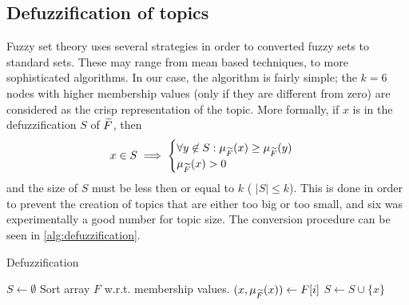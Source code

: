 \subsection{Defuzzification of topics}
Fuzzy set theory uses several strategies in order to converted fuzzy sets to standard sets. These may range from mean based techniques, to more sophisticated algorithms. In our case, the algorithm is fairly simple; the $k=6$ nodes with higher membership values (only if they are different from zero) are considered as the crisp representation of the topic. More formally, if $x$ is in the defuzzification $S$ of $\widetilde{F}$, then 
$$
    x\in S \implies \begin{cases}
    \forall y\not\in S: \mu_{\widetilde{F}}(x) \ge \mu_{\widetilde{F}}(y)\\
    \mu_{\widetilde{F}}(x) > 0
    \end{cases}
$$
and the size of $S$ must be less then or equal to $k$ (\ie{} $|S| \le k$).
This is done in order to prevent the creation of topics  that are either too big or too small, and six was experimentally a good number for topic size. The conversion procedure can be seen in \cref{alg:defuzzification}.
\begin{algorithm}
\caption{Defuzzification}\label{alg:defuzzification}
\begin{algorithmic}[1]
    \Statex
        \State{} $ S \leftarrow \emptyset$ 
        \State{} Sort array $F$ w.r.t. membership values.
        \State{} $(x,\mu_{\widetilde{F}}(x))\leftarrow F[i]$
         $S\leftarrow S \cup \{x\}$
        \EndIf
	\EndFor
	\State {}
	\EndProcedure
\end{algorithmic}
\end{algorithm}



